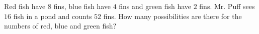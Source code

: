 Red fish have $8$ fins, blue fish have $4$ fins and green fish have $2$ fins. Mr. Puff sees $16$ fish in a pond and counts $52$ fins. How many possibilities are there for the numbers of red, blue and green fish?
